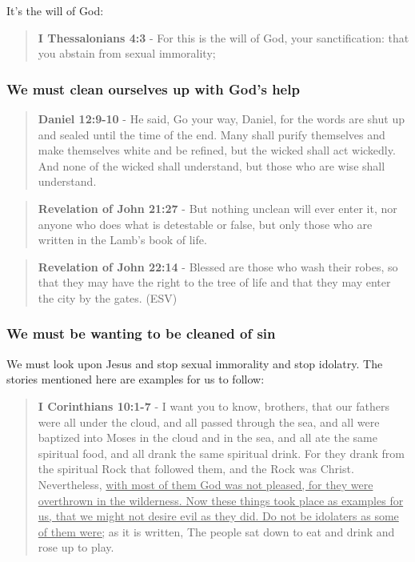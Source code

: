 \documentclass[11pt]{article}
\begin{document}
It's the will of God:

\begin{quote}
\textbf{I Thessalonians 4:3} - For this is the will of God, your sanctification: that you abstain from sexual immorality;
\end{quote}

\subsubsection{We \textbf{must} clean ourselves up with God's help}
\label{sec:orgc099ef6}
\begin{quote}
\textbf{Daniel 12:9-10} - He said, Go your way, Daniel, for the words are shut up and sealed until the time of the end.  Many shall purify themselves and make themselves white and be refined, but the wicked shall act wickedly. And none of the wicked shall understand, but those who are wise shall understand.
\end{quote}

\begin{quote}
\textbf{Revelation of John 21:27} - But nothing unclean will ever enter it, nor anyone who does what is detestable or false, but only those who are written in the Lamb's book of life.
\end{quote}

\begin{quote}
\textbf{Revelation of John 22:14} - Blessed are those who wash their robes, so that they may have the right to the tree of life and that they may enter the city by the gates. (ESV)
\end{quote}

\subsubsection{We must be wanting to be cleaned of sin}
\label{sec:org09aaa7c}
We must look upon Jesus and stop sexual immorality and stop idolatry. The stories mentioned here are examples for us to follow:

\begin{quote}
\textbf{I Corinthians 10:1-7} - I want you to know, brothers, that our fathers were all under the cloud, and all passed through the sea, and all were baptized into Moses in the cloud and in the sea, and all ate the same spiritual food, and all drank the same spiritual drink. For they drank from the spiritual Rock that followed them, and the Rock was Christ. Nevertheless, \uline{with most of them God was not pleased, for they were overthrown in the wilderness. Now these things took place as examples for us, that we might not desire evil as they did. Do not be idolaters as some of them were;} as it is written, The people sat down to eat and drink and rose up to play.
\end{quote}
\end{document}

